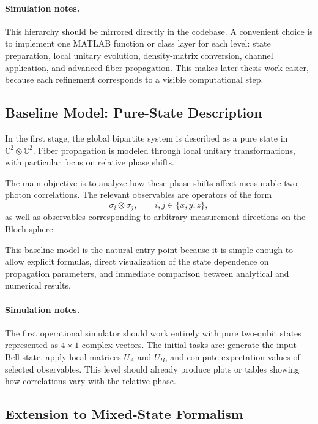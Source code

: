 \documentclass[a4paper]{article}
\begin{document}
\paragraph{Simulation notes.}
This hierarchy should be mirrored directly in the codebase. A convenient choice is to implement one MATLAB function or class layer for each level: state preparation, local unitary evolution, density-matrix conversion, channel application, and advanced fiber propagation. This makes later thesis work easier, because each refinement corresponds to a visible computational step.

\subsection{Baseline Model: Pure-State Description}

In the first stage, the global bipartite system is described as a pure state in \(\mathbb{C}^2 \otimes \mathbb{C}^2\). Fiber propagation is modeled through local unitary transformations, with particular focus on relative phase shifts.

The main objective is to analyze how these phase shifts affect measurable two-photon correlations. The relevant observables are operators of the form
\[
\sigma_i \otimes \sigma_j,
\qquad i,j \in \{x,y,z\},
\]
as well as observables corresponding to arbitrary measurement directions on the Bloch sphere.

This baseline model is the natural entry point because it is simple enough to allow explicit formulas, direct visualization of the state dependence on propagation parameters, and immediate comparison between analytical and numerical results.

\paragraph{Simulation notes.}
The first operational simulator should work entirely with pure two-qubit states represented as \(4 \times 1\) complex vectors. The initial tasks are: generate the input Bell state, apply local matrices \(U_A\) and \(U_B\), and compute expectation values of selected observables. This level should already produce plots or tables showing how correlations vary with the relative phase.

\subsection{Extension to Mixed-State Formalism}
\end{document}
